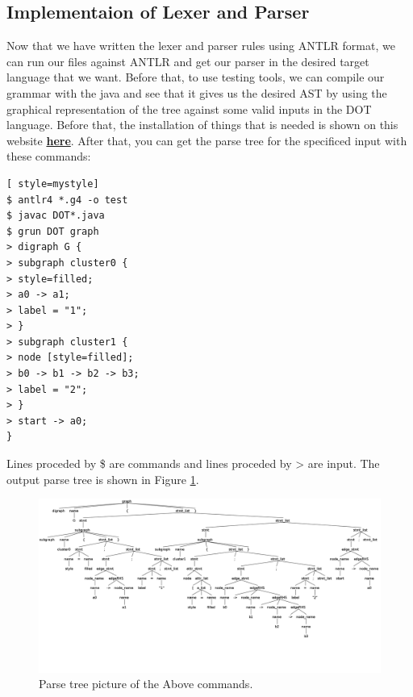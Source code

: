 \subsection{Implementaion of Lexer and Parser}
Now that we have written the lexer and parser rules 
using ANTLR format, we can run our files against 
ANTLR and get our parser in the desired target 
language that we want. Before that, to use testing 
tools, we can compile our grammar with the java and 
see that it gives us the desired AST by using the 
graphical representation of the tree against some 
valid inputs in the DOT language. Before that, the 
installation of things that is needed is shown on this 
website \href{https://www.antlr.org/index.html}{\textbf{here}}. 
After that, you can get the parse tree for the specificed input with these commands:
\begin{lstlisting}[ style=mystyle]
$ antlr4 *.g4 -o test
$ javac DOT*.java
$ grun DOT graph
> digraph G {
> subgraph cluster0 {
> style=filled;
> a0 -> a1;
> label = "1";
> }
> subgraph cluster1 {
> node [style=filled];
> b0 -> b1 -> b2 -> b3;
> label = "2";
> }
> start -> a0;
}
\end{lstlisting}
Lines proceded by \$ are commands and lines proceded by
> are input. The output parse tree is shown in Figure \ref{fig:parse-tree}.

\begin{figure}[H]
\centering
\includegraphics[width=\linewidth]{images/parse-tree.png}
\caption{Parse tree picture of the Above commands.}
\label{fig:parse-tree}
\end{figure}